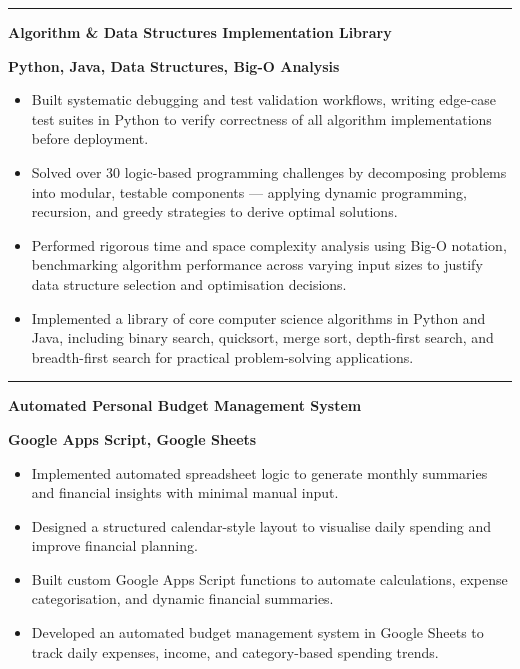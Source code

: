 \documentclass[11pt, a4paper]{article}
\begin{document}
\vspace{8pt}
\noindent%
{\color{DKGreen}\rule{4pt}{14pt}}\hspace{6pt}%
\textcolor{DarkTxt}{\textbf{\large Algorithm \& Data Structures Implementation Library}}\par
\vspace{1pt}
\noindent\hspace{10pt}\textcolor{DKGreen}{\textbf{\small Python, Java, Data Structures, Big-O Analysis}}
\vspace{2pt}
\begin{itemize}
  \item \textcolor{MidTxt}{Built systematic debugging and test validation workflows, writing edge-case test suites in Python to verify correctness of all algorithm implementations before deployment.}
  \item \textcolor{MidTxt}{Solved over 30 logic-based programming challenges by decomposing problems into modular, testable components — applying dynamic programming, recursion, and greedy strategies to derive optimal solutions.}
  \item \textcolor{MidTxt}{Performed rigorous time and space complexity analysis using Big-O notation, benchmarking algorithm performance across varying input sizes to justify data structure selection and optimisation decisions.}
  \item \textcolor{MidTxt}{Implemented a library of core computer science algorithms in Python and Java, including binary search, quicksort, merge sort, depth-first search, and breadth-first search for practical problem-solving applications.}
\end{itemize}
\vspace{2pt}

\vspace{8pt}
\noindent%
{\color{DKGreen}\rule{4pt}{14pt}}\hspace{6pt}%
\textcolor{DarkTxt}{\textbf{\large Automated Personal Budget Management System}}\par
\vspace{1pt}
\noindent\hspace{10pt}\textcolor{DKGreen}{\textbf{\small Google Apps Script, Google Sheets}}
\vspace{2pt}
\begin{itemize}
  \item \textcolor{MidTxt}{Implemented automated spreadsheet logic to generate monthly summaries and financial insights with minimal manual input.}
  \item \textcolor{MidTxt}{Designed a structured calendar-style layout to visualise daily spending and improve financial planning.}
  \item \textcolor{MidTxt}{Built custom Google Apps Script functions to automate calculations, expense categorisation, and dynamic financial summaries.}
  \item \textcolor{MidTxt}{Developed an automated budget management system in Google Sheets to track daily expenses, income, and category-based spending trends.}
\end{itemize}
\vspace{2pt}
\end{document}
